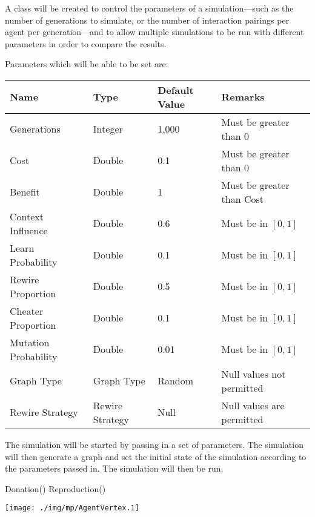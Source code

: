 A class will be created to control the parameters of a simulation---such
as the number of generations to simulate, or the number of interaction
pairings per agent per generation---and to allow multiple simulations to
be run with different parameters in order to compare the results.

Parameters which will be able to be set are:

\begin{tabular}{llll}
    Name & Type & Default Value & Remarks \\
    \hline
    Generations & Integer & 1,000 & Must be greater than 0\\
    Cost & Double & 0.1 & Must be greater than 0 \\
    Benefit & Double & 1 & Must be greater than Cost \\
    Context Influence & Double & 0.6 & Must be in $[0, 1]$ \\
    Learn Probability & Double & 0.1 & Must be in $[0, 1]$ \\
    Rewire Proportion & Double & 0.5 & Must be in $[0, 1]$ \\
    Cheater Proportion & Double & 0.1 & Must be in $[0, 1]$ \\
    Mutation Probability & Double & 0.01 & Must be in $[0, 1]$ \\
    Graph Type & Graph Type & Random & Null values not permitted \\
    Rewire Strategy & Rewire Strategy & Null & Null values are permitted
    \\
\end{tabular}

The simulation will be started by passing in a set of parameters.
The simulation will then generate a graph and set the initial state of
the simulation according to the parameters passed in.
The simulation will then be run.

\begin{algorithmic}
    \State Donation()
    \State Reproduction()
\EndWhile
\end{algorithmic}

\texttt{[image: ./img/mp/AgentVertex.1]}
